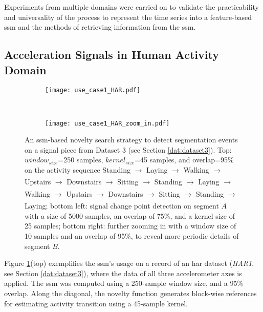 Experiments from multiple domains were carried on to validate the practicability and universality of the process to represent the time series into a feature-based \gls{ssm} and the methods of retrieving information from the \gls{ssm}.

\subsection{Acceleration Signals in Human Activity Domain}
\label{sec:acc_har}

\begin{figure}
    \centering
    \begin{subfigure}[b]{\textwidth}
        \centering
        \texttt{[image: use\_case1\_HAR.pdf]}
    \end{subfigure}\\
    \vspace{2mm}
    \begin{subfigure}[b]{\textwidth}
         \centering
        \texttt{[image: use\_case1\_HAR\_zoom\_in.pdf]}     
    \end{subfigure}
    \caption{An \gls{ssm}-based novelty search strategy to detect segmentation events on a signal piece from Dataset 3 (see Section \ref{dat:dataset3}). Top: $window_{size}$=250 samples, $kernel_{size}$=45 samples, and overlap=95\% on the activity sequence Standing $\xrightarrow[]{}$ Laying $\xrightarrow[]{}$ Walking $\xrightarrow[]{}$ Upstairs $\xrightarrow[]{}$ Downstairs $\xrightarrow[]{}$ Sitting $\xrightarrow[]{}$ Standing $\xrightarrow[]{}$ Laying $\xrightarrow[]{}$ Walking $\xrightarrow[]{}$ Upstairs
    $\xrightarrow[]{}$ Downstairs $\xrightarrow[]{}$ Sitting $\xrightarrow[]{}$ Standing
    $\xrightarrow[]{}$ Laying; bottom left: signal change point detection on segment $A$ with a size of 5000 samples, an overlap of 75\%, and a kernel size of 25 samples; bottom right: further zooming in with a window size of 10 samples and an overlap of 95\%, to reveal more periodic details of segment $B$.}
    \label{fig:use_case1}
\end{figure}


Figure \ref{fig:use_case1}(top) exemplifies the \gls{ssm}'s usage on a record of an \gls{har} dataset (\textit{HAR1}, see Section \ref{dat:dataset3}), where the data of all three accelerometer axes is applied. The \gls{ssm} was computed using a 250-sample window size, and a 95\% overlap. Along the diagonal, the novelty function generates block-wise references for estimating activity transition using a 45-sample kernel.

